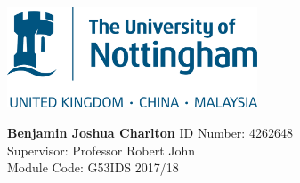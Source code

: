 \documentclass[a4paper]{article}
\begin{document}

\begin{center}
	\includegraphics[height=3cm]{UoNLogo.png}

	\vfill
	\Huge{\textbf{Benjamin Joshua Charlton}}
	\vfill
	\LARGE{	ID Number: 4262648 \\
			Supervisor: Professor Robert John \\
			Module Code: G53IDS
			\vfill
			2017/18
			\vfill}
	\afterpage{\null\newpage}
\end{center}
\end{document}
